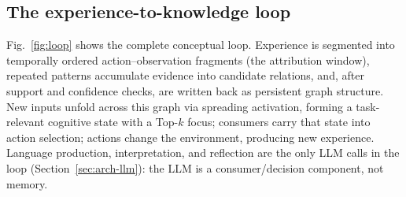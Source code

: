 \documentclass[10pt,a4paper]{article}
\begin{document}
\subsection{The experience-to-knowledge loop}
\label{sec:arch-loop}
Fig.~\ref{fig:loop} shows the complete conceptual loop. Experience is segmented into temporally ordered action--observation fragments (the attribution window), repeated patterns accumulate evidence into candidate relations, and, after support and confidence checks, are written back as persistent graph structure. New inputs unfold across this graph via spreading activation, forming a task-relevant cognitive state with a Top-$k$ focus; consumers carry that state into action selection; actions change the environment, producing new experience. Language production, interpretation, and reflection are the only LLM calls in the loop (Section~\ref{sec:arch-llm}): the LLM is a consumer/decision component, not memory.
\end{document}
